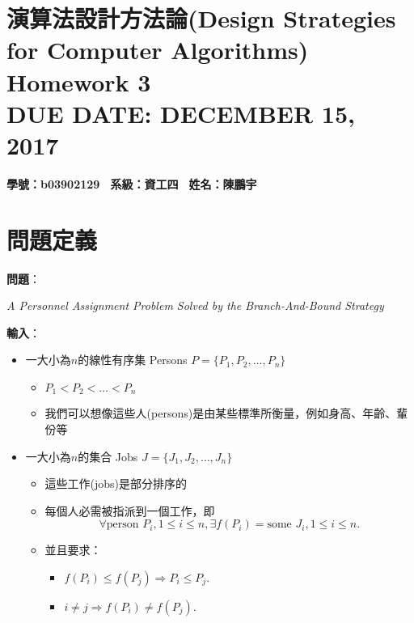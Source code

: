 \documentclass[15pt]{extarticle}
\begin{document}
 
\fontsize{12pt}{12pt}\selectfont
\section*{演算法設計方法論(Design Strategies for Computer Algorithms) \\
\normalsize{Homework 3} \\
\normalsize{DUE DATE: DECEMBER 15, 2017}}

\hfill \textbf{學號：b03902129 \, 系級：資工四 \, 姓名：陳鵬宇} \\

\section{問題定義}
\textbf{問題}：\begin{minipage}[t]{0.8\linewidth}
    \textit{A Personnel Assignment Problem Solved by the Branch-And-Bound Strategy} \vskip0mm
\end{minipage}

\vskip3mm
\textbf{輸入}：
\begin{minipage}[t]{0.8\linewidth}
    \begin{itemize}
        \item 一大小為$n$的線性有序集 Persons $P=\{P_1, P_2, \dots, P_n\}$
        \begin{itemize}
            \item $P_1 < P_2 < \dots < P_n$
            \item 我們可以想像這些人(persons)是由某些標準所衡量，例如身高、年齡、輩份等 
    \end{itemize}
        \item 一大小為$n$的集合 Jobs $J=\{J_1,J_2,\dots,J_n\}$
        \begin{itemize}
            \item 這些工作(jobs)是部分排序的
            \item 每個人必需被指派到一個工作，即$$\forall\mbox{person } P_i, 1\le i\le n,\exists f(P_i)=\mbox{some }J_i, 1\le i\le n.$$
            \item 並且要求：
            \begin{itemize}
                \item $f(P_i)\le f(P_j)\Rightarrow P_i\le P_j.$
                \item $i\ne j\Rightarrow f(P_i)\ne f(P_j).$
            \end{itemize}
        \end{itemize}
    \end{itemize}
\end{minipage}
\end{document}
